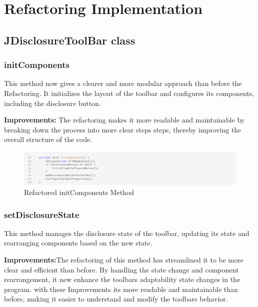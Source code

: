 \section{Refactoring Implementation}
\subsection{JDisclosureToolBar class}





\subsubsection{initComponents}
This method now gives a clearer and more modular approach than before the Refactoring.
It initializes the layout of the toolbar and configures its components, including the disclosure button.

\textbf{Improvements:}
The refactoring makes it more readable and maintainable by breaking down the process into more clear steps steps,
thereby improving the overall structure of the code.

\begin{figure}[H]
    \centering
    \includegraphics[width=\linewidth]{pic/F initComponents.png}
    \caption{Refactored initComponents Method}
    \label{fig:Refactored initComponents Method}
\end{figure}





\subsubsection{setDisclosureState}
This method manages the disclosure state of the toolbar, updating its state and rearranging components based on the new state.


\textbf{Improvements:}The refactoring of this method has streamlined it to be more clear and efficient than before.
By handling the state change and component rearrangement, it new enhance the toolbars adaptability state changes in the program.
with these Improvements its more readable and maintainable than before,
making it easier to understand and modify the toolbars behavior.

